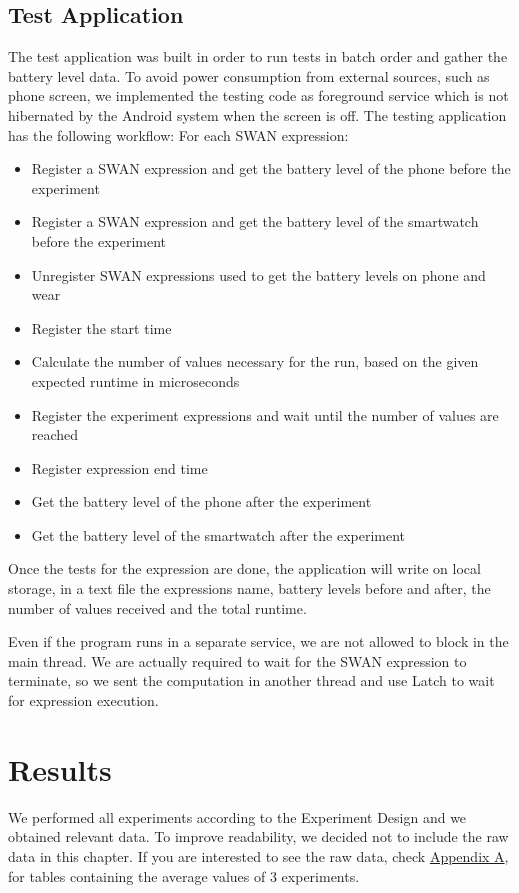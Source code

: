 \subsection{Test Application}
The test application was built in order to run tests in batch order and gather the battery level data. To avoid power consumption from external sources, such as phone screen, we implemented the testing code as foreground service\cite{foreground_service} which is not hibernated by the Android system when the screen is off. 
The testing application has the following workflow:
For each SWAN expression:
\begin{itemize}
 \item Register a SWAN expression and get the battery level of the phone before the experiment
 \item Register a SWAN expression and get the battery level of the smartwatch before the experiment
 \item Unregister SWAN expressions used to get the battery levels on phone and wear
 \item Register the start time
 \item Calculate the number of values necessary for the run, based on the given expected runtime in microseconds
 \item Register the experiment expressions and wait until the number of values are reached
 \item Register expression end time
 \item Get the battery level of the phone after the experiment
 \item Get the battery level of the smartwatch after the experiment
\end{itemize}


Once the tests for the expression are done, the application will write on local storage, in a text file the expressions name,
battery levels before and after, the number of values received and the total runtime.

Even if the program runs in a separate service, we are not allowed to block in the main thread. 
We are actually required to wait for the SWAN expression to terminate, so we sent the computation in another thread and use Latch\cite{latch} to wait for expression execution.

\section{Results}

We performed all experiments according to the Experiment Design and we obtained relevant data. To improve readability,
we decided not to include the raw data in this chapter. If you are interested to see the raw data, check \hyperref[AppendixPower]{Appendix A}, for tables containing the
average values of 3 experiments.

